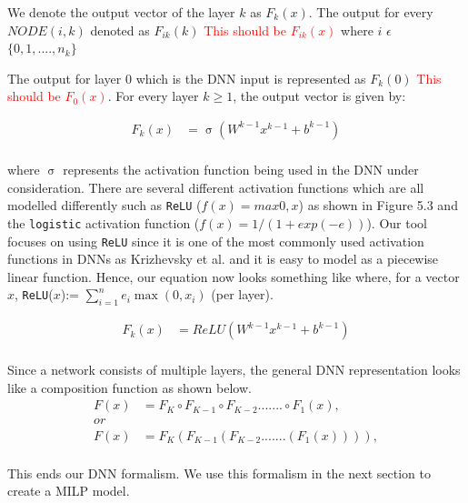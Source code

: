We denote the output vector of the layer $k$ as $F_k(x)$.
The output for every $NODE(i,k)$ denoted as $F_{ik}(k)$ \textcolor{red}{This should be $F_{ik}(x)$} where $i$ $\epsilon$ $\{0,1,....,n_k\}$ 

The output for layer 0 which is the \ac{DNN} input is represented as $F_k(0)$ \textcolor{red}{This should be $F_{0}(x)$}.
For every layer $k \geq 1$, the output vector is given by: 

\begin{equation}
\begin{aligned}
F_k(x) &= \upsigma(W^{k-1}x^{k-1} + b^{k-1}) \\
\end{aligned}
\end{equation}

where $\upsigma$ represents the activation function being used in the DNN under consideration.
There are several different activation functions which are all modelled differently such as \texttt{ReLU} ($f(x) = max {0,x}$) as shown in Figure 5.3 and the \texttt{logistic} activation function ($f(x)=1/(1+ exp(-e))$).
Our tool focuses on using \texttt{ReLU} since it is one of the most commonly used activation functions in \ac{DNN}s as Krizhevsky et al. \cite{10.1145/3065386} and it is easy to model as a piecewise linear function. 
Hence, our equation now looks  something like where, for a vector $x$, \texttt{ReLU}($x$):= $\sum_{i=1}^{n} e_{i}\max(0, x_{i})$ (per layer).

\begin{equation}
\begin{aligned}
F_k(x) &= ReLU(W^{k-1}x^{k-1} + b^{k-1}) \\
\end{aligned}
\end{equation}

Since a network consists of multiple layers, the general \ac{DNN} representation looks like a composition function as shown below. 
\begin{equation}
	\begin{aligned}
	F(x) &= F_K \circ F_{K-1} \circ F_{K-2} ....... \circ F_1(x),    \\
	or \\
	F(x) &= F_K ( F_{K-1}( F_{K-2} .......  (F_1(x)))),    \\
	\end{aligned}
\end{equation}

This ends our \ac{DNN} formalism. We use this formalism in the next section to create a \ac{MILP} model. 

